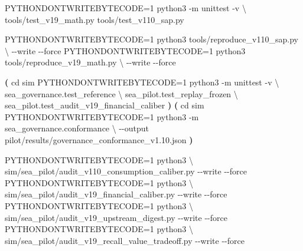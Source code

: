 \documentclass[
  11pt]{article}
\newenvironment{Shaded}{}{}
\newcommand{\AttributeTok}[1]{\textcolor[rgb]{0.49,0.56,0.16}{#1}}
\newcommand{\BuiltInTok}[1]{\textcolor[rgb]{0.00,0.50,0.00}{#1}}
\newcommand{\DataTypeTok}[1]{\textcolor[rgb]{0.56,0.13,0.00}{#1}}
\newcommand{\ExtensionTok}[1]{#1}
\newcommand{\KeywordTok}[1]{\textcolor[rgb]{0.00,0.44,0.13}{\textbf{#1}}}
\newcommand{\NormalTok}[1]{#1}
\newcommand{\OperatorTok}[1]{\textcolor[rgb]{0.40,0.40,0.40}{#1}}
\newcommand{\VariableTok}[1]{\textcolor[rgb]{0.10,0.09,0.49}{#1}}
\begin{document}
\begin{Shaded}
\begin{Highlighting}[]
\VariableTok{PYTHONDONTWRITEBYTECODE}\OperatorTok{=}\NormalTok{1 }\ExtensionTok{python3} \AttributeTok{{-}m}\NormalTok{ unittest }\AttributeTok{{-}v} \DataTypeTok{\textbackslash{}}
\NormalTok{  tools/test\_v19\_math.py tools/test\_v110\_sap.py}

\VariableTok{PYTHONDONTWRITEBYTECODE}\OperatorTok{=}\NormalTok{1 }\ExtensionTok{python3}\NormalTok{ tools/reproduce\_v110\_sap.py }\DataTypeTok{\textbackslash{}}
  \AttributeTok{{-}{-}write} \AttributeTok{{-}{-}force}
\VariableTok{PYTHONDONTWRITEBYTECODE}\OperatorTok{=}\NormalTok{1 }\ExtensionTok{python3}\NormalTok{ tools/reproduce\_v19\_math.py }\DataTypeTok{\textbackslash{}}
  \AttributeTok{{-}{-}write} \AttributeTok{{-}{-}force}

\KeywordTok{(}
  \BuiltInTok{cd}\NormalTok{ sim}
  \VariableTok{PYTHONDONTWRITEBYTECODE}\OperatorTok{=}\NormalTok{1 }\ExtensionTok{python3} \AttributeTok{{-}m}\NormalTok{ unittest }\AttributeTok{{-}v} \DataTypeTok{\textbackslash{}}
\NormalTok{    sea\_governance.test\_reference }\DataTypeTok{\textbackslash{}}
\NormalTok{    sea\_pilot.test\_replay\_frozen }\DataTypeTok{\textbackslash{}}
\NormalTok{    sea\_pilot.test\_audit\_v19\_financial\_caliber}
\KeywordTok{)}
\KeywordTok{(}
  \BuiltInTok{cd}\NormalTok{ sim}
  \VariableTok{PYTHONDONTWRITEBYTECODE}\OperatorTok{=}\NormalTok{1 }\ExtensionTok{python3} \AttributeTok{{-}m}\NormalTok{ sea\_governance.conformance }\DataTypeTok{\textbackslash{}}
    \AttributeTok{{-}{-}output}\NormalTok{ pilot/results/governance\_conformance\_v1.10.json}
\KeywordTok{)}

\VariableTok{PYTHONDONTWRITEBYTECODE}\OperatorTok{=}\NormalTok{1 }\ExtensionTok{python3} \DataTypeTok{\textbackslash{}}
\NormalTok{  sim/sea\_pilot/audit\_v110\_consumption\_caliber.py }\AttributeTok{{-}{-}write} \AttributeTok{{-}{-}force}
\VariableTok{PYTHONDONTWRITEBYTECODE}\OperatorTok{=}\NormalTok{1 }\ExtensionTok{python3} \DataTypeTok{\textbackslash{}}
\NormalTok{  sim/sea\_pilot/audit\_v19\_financial\_caliber.py }\AttributeTok{{-}{-}write} \AttributeTok{{-}{-}force}
\VariableTok{PYTHONDONTWRITEBYTECODE}\OperatorTok{=}\NormalTok{1 }\ExtensionTok{python3} \DataTypeTok{\textbackslash{}}
\NormalTok{  sim/sea\_pilot/audit\_v19\_upstream\_digest.py }\AttributeTok{{-}{-}write} \AttributeTok{{-}{-}force}
\VariableTok{PYTHONDONTWRITEBYTECODE}\OperatorTok{=}\NormalTok{1 }\ExtensionTok{python3} \DataTypeTok{\textbackslash{}}
\NormalTok{  sim/sea\_pilot/audit\_v19\_recall\_value\_tradeoff.py }\AttributeTok{{-}{-}write} \AttributeTok{{-}{-}force}


\end{Highlighting}
\end{Shaded}
\end{document}
